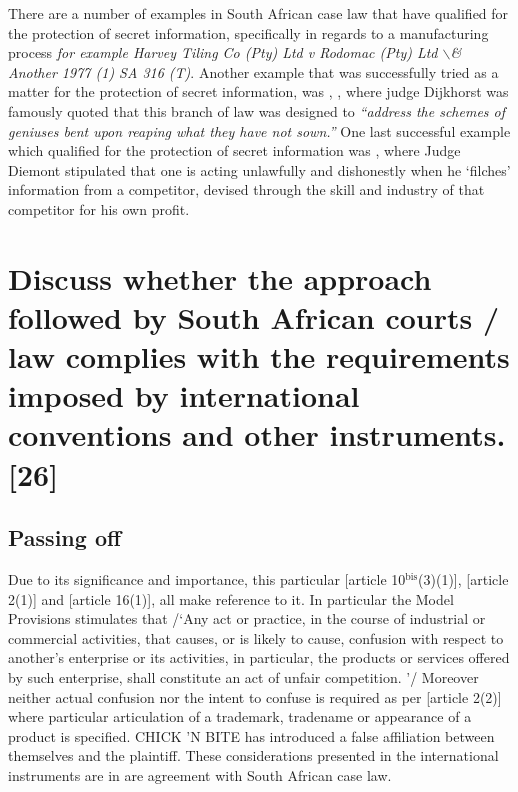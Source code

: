 \documentclass[11pt]{article}
\begin{document}
There are a number of examples in South African case law that have qualified for
the protection of secret information, specifically in regards to a manufacturing
process \emph{for example Harvey Tiling Co (Pty) Ltd v Rodomac (Pty) Ltd $\backslash$& Another
1977 (1) SA 316 (T)}. Another example that was successfully tried as a matter
for the protection of secret information, was
, \cite{dijkhorst81_atlas_v_pikkewyn}, where
judge Dijkhorst was famously quoted that this branch of law was designed to
\emph{``address the schemes of geniuses bent upon reaping what they have not sown.''}
One last successful example which qualified for the protection of secret
information was 
\cite{diemont72_stellwinetrust_v_oudemeester}, where Judge Diemont stipulated that
one is acting unlawfully and dishonestly when he `filches' information from a
competitor, devised through the skill and industry of that competitor for his
own profit.

\section{Discuss whether the approach followed by South African courts / law complies with the requirements imposed by international conventions and other instruments. [26]}
\label{sec:org0cdf5df}
\subsection{Passing off}
\label{sec:orgf3cfaaf}
Due to its significance and importance, this particular [article
10\(^{\text{bis}}\)(3)(1)]\cite{wipo83_paris_conve_protect_ip}, [article
2(1)]\cite{wipo96_model_provi_unfair_comp} and [article 16(1)]\cite{wto17_trips},
all make reference to it. In particular  the Model Provisions stimulates that /‘Any act or practice, in the course of industrial or commercial
activities, that causes, or is likely to cause, confusion with
respect to another’s enterprise or its activities, in particular,
the products or services offered by such enterprise, shall
constitute an act of unfair competition. ’/ Moreover neither actual confusion nor the intent to confuse is required as per
[article 2(2)]\cite{wipo96_model_provi_unfair_comp} where particular articulation
of a trademark, tradename or appearance of a product is specified. CHICK 'N BITE
has introduced a false affiliation between themselves and the plaintiff. These considerations presented in the international instruments are in are
agreement with South African case law.

\printbibliography
\end{document}
